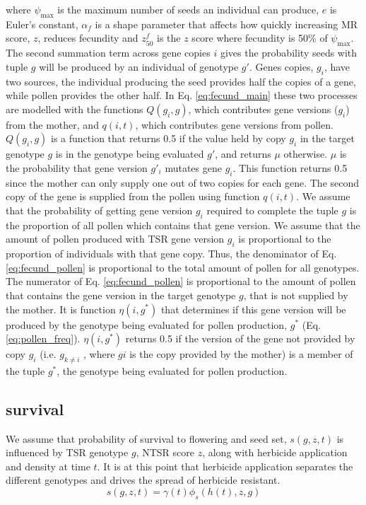 \documentclass[12pt, a4paper]{article}
\begin{document}
where $\psi_\text{max}$ is the maximum number of seeds an individual can produce, $e$ is Euler's constant, $\alpha_f$ is a shape parameter that affects how quickly increasing MR score, $z$, reduces fecundity and $z_{50}^f$ is the $z$ score where fecundity is 50\% of $\psi_\text{max}$. The second summation term across gene copies $i$ gives the probability seeds with tuple $g$ will be produced by an individual of genotype $g'$. Genes copies, $g_i$, have two sources, the individual producing the seed provides half the copies of a gene, while pollen provides the other half. In Eq. \ref{eq:fecund_main} these two processes are modelled with the functions $Q(g_i, g)$, which contributes gene versions ($g_i$) from the mother, and $q(i, t)$, which contributes gene versions from pollen. $Q(g_i, g)$ is a function that returns 0.5 if the value held by copy $g_i$ in the target genotype $g$ is in the genotype being evaluated $g'$, and returns $\mu$ otherwise. $\mu$ is the probability that gene version $g'_i$ mutates gene $g_i$. This function returns 0.5 since the mother can only supply one out of two copies for each gene. The second copy of the gene is supplied from the pollen using function $q(i, t)$. We assume that the probability of getting gene version $g_i$ required to complete the tuple $g$ is the proportion of all pollen which contains that gene version. We assume that the amount of pollen produced with TSR gene version $g_i$ is proportional to the proportion of individuals with that gene copy. Thus, the denominator of Eq. \ref{eq:fecund_pollen} is proportional to the total amount of pollen for all genotypes. The numerator of Eq. \ref{eq:fecund_pollen} is proportional to the amount of pollen that contains the gene version in the target genotype $g$, that is not supplied by the mother. It is function $\eta(i, g^*)$ that determines if this gene version will be produced by the genotype being evaluated for pollen production, $g^*$ (Eq. \ref{eq:pollen_freq}). $\eta(i, g^*)$ returns 0.5 if the version of the gene not provided by copy $g_i$ (i.e. $g_{k \neq i}$ , where $gi$ is the copy provided by the mother) is a member of the tuple $g^*$, the genotype being evaluated for pollen production.

\subsection{survival}   
We assume that probability of survival to flowering and seed set, $s(g, z, t)$ is influenced by TSR genotype $g$, NTSR score $z$, along with herbicide application and density at time $t$. It is at this point that herbicide application separates the different genotypes and drives the spread of herbicide resistant.     
\begin{equation}\label{eq:survival}
	s(g, z, t) = \gamma(t)\phi_s(h(t), z, g) 
\end{equation}
\end{document}
